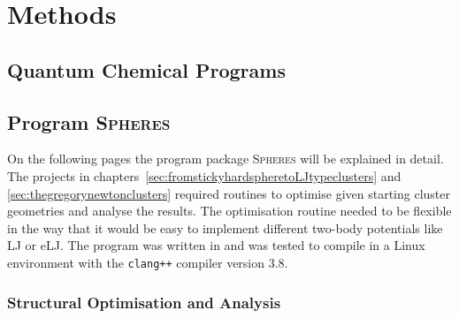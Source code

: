 
\part{Methods}
\label{sec:methods}

\chapter{Quantum Chemical Programs}
\label{sec:quantumchemicalprograms}

\chapter{Program \textsc{Spheres}}
\label{sec:theprogramspheres}

On the following pages the program package \textsc{Spheres} will be explained
in detail. The projects in
chapters~\ref{sec:fromstickyhardspheretoLJtypeclusters} and
\ref{sec:thegregorynewtonclusters} required routines to optimise given starting
cluster geometries and analyse the results. The optimisation routine needed to
be flexible in the way that it would be easy to implement different two-body
potentials like \ac{LJ} or \ac{eLJ}. The program was written in \Cpp
and was tested to compile in a Linux environment with the \texttt{clang++}
compiler version 3.8.

\section{Structural Optimisation and Analysis}
\label{sec:generalstructure}

